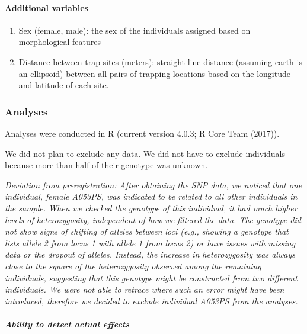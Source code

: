 \documentclass[
]{article}
\begin{document}
\hypertarget{additional-variables}{%
\paragraph{Additional variables}\label{additional-variables}}

\begin{enumerate}
\def\labelenumi{\arabic{enumi})}
\item
  Sex (female, male): the sex of the individuals assigned based on
  morphological features
\item
  Distance between trap sites (meters): straight line distance (assuming
  earth is an ellipsoid) between all pairs of trapping locations based
  on the longitude and latitude of each site.
\end{enumerate}

\hypertarget{analyses}{%
\subsubsection{Analyses}\label{analyses}}

Analyses were conducted in R (current version 4.0.3; R Core Team
(2017)).

We did not plan to exclude any data. We did not have to exclude
individuals because more than half of their genotype was unknown.

\emph{Deviation from preregistration: After obtaining the SNP data, we
noticed that one individual, female A053PS, was indicated to be related
to all other individuals in the sample. When we checked the genotype of
this individual, it had much higher levels of heterozygosity,
independent of how we filtered the data. The genotype did not show signs
of shifting of alleles between loci (e.g., showing a genotype that lists
allele 2 from locus 1 with allele 1 from locus 2) or have issues with
missing data or the dropout of alleles. Instead, the increase in
heterozygosity was always close to the square of the heterozygosity
observed among the remaining individuals, suggesting that this genotype
might be constructed from two different individuals. We were not able to
retrace where such an error might have been introduced, therefore we
decided to exclude individual A053PS from the analyses.}

\hypertarget{ability-to-detect-actual-effects}{%
\paragraph{\texorpdfstring{\emph{Ability to detect actual
effects}}{Ability to detect actual effects}}\label{ability-to-detect-actual-effects}}
\end{document}
